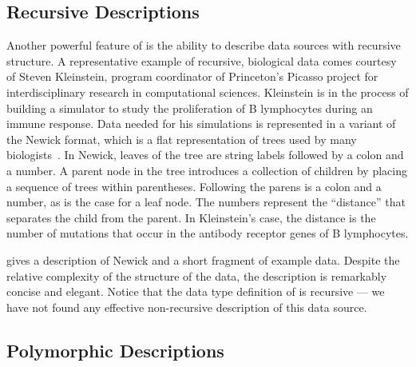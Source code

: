 \subsection{Recursive Descriptions}

Another powerful feature of \padsml{} is the ability to describe data
sources with recursive structure.  A representative example of
recursive, biological data comes courtesy of Steven Kleinstein,
program coordinator of Princeton's Picasso project for
interdisciplinary research in computational sciences.  
Kleinstein is
in the process of building a simulator to study the proliferation of B
lymphocytes during an immune response.  Data needed for his
simulations is represented in a variant of the Newick format, which is
a flat representation of trees used by many biologists~\cite{newick}.
In Newick, leaves of the tree are string labels followed by a colon
and a number.  A parent node in the tree introduces a collection of
children by placing a sequence of trees within parentheses.  Following the
parens is a colon and a number, as is the case for a leaf node.  The
numbers represent the ``distance'' that separates the child from the
parent.  In Kleinstein's case, the distance is the number of mutations
that occur in the antibody receptor genes of B lymphocytes.

 gives a description of Newick and a short fragment 
of example data.  Despite the relative complexity of the structure of the data,
the description is remarkably concise and elegant.  Notice that the data type
definition of  is recursive --- we have not found any
effective non-recursive description of this data source.


\subsection{Polymorphic Descriptions}

